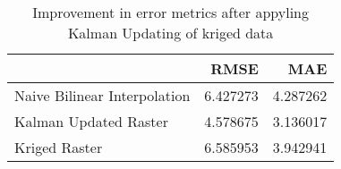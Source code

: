 \begin{table}
\caption{Improvement in error metrics after appyling Kalman Updating of kriged data}
\label{tab:stcroix_lidar_error}
\begin{tabular}{lrr}
\toprule
 & RMSE & MAE \\
\midrule
Naive Bilinear Interpolation & 6.427273 & 4.287262 \\
Kalman Updated Raster & 4.578675 & 3.136017 \\
Kriged Raster & 6.585953 & 3.942941 \\
\bottomrule
\end{tabular}
\end{table}

